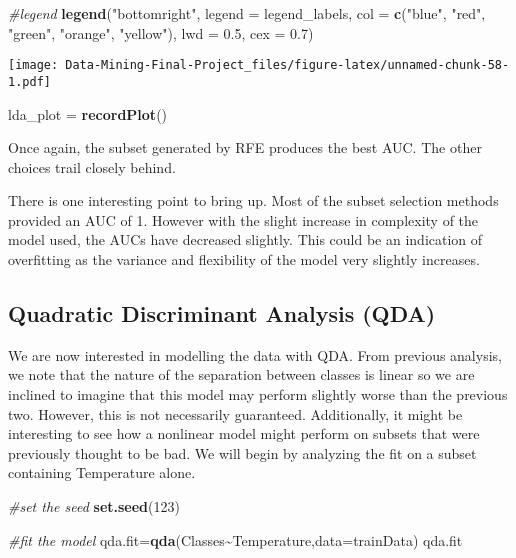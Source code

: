 \documentclass[
]{article}
\newenvironment{Shaded}{\begin{snugshade}}{\end{snugshade}}
\newcommand{\AttributeTok}[1]{\textcolor[rgb]{0.13,0.29,0.53}{#1}}
\newcommand{\CommentTok}[1]{\textcolor[rgb]{0.56,0.35,0.01}{\textit{#1}}}
\newcommand{\DecValTok}[1]{\textcolor[rgb]{0.00,0.00,0.81}{#1}}
\newcommand{\FloatTok}[1]{\textcolor[rgb]{0.00,0.00,0.81}{#1}}
\newcommand{\FunctionTok}[1]{\textcolor[rgb]{0.13,0.29,0.53}{\textbf{#1}}}
\newcommand{\NormalTok}[1]{#1}
\newcommand{\OtherTok}[1]{\textcolor[rgb]{0.56,0.35,0.01}{#1}}
\newcommand{\SpecialCharTok}[1]{\textcolor[rgb]{0.81,0.36,0.00}{\textbf{#1}}}
\newcommand{\StringTok}[1]{\textcolor[rgb]{0.31,0.60,0.02}{#1}}
\begin{document}
\begin{Shaded}
\begin{Highlighting}[]
\CommentTok{\#legend}
\FunctionTok{legend}\NormalTok{(}\StringTok{"bottomright"}\NormalTok{, }\AttributeTok{legend =}\NormalTok{ legend\_labels, }\AttributeTok{col =} \FunctionTok{c}\NormalTok{(}\StringTok{"blue"}\NormalTok{, }\StringTok{"red"}\NormalTok{, }\StringTok{"green"}\NormalTok{, }\StringTok{"orange"}\NormalTok{, }\StringTok{"yellow"}\NormalTok{), }\AttributeTok{lwd =} \FloatTok{0.5}\NormalTok{, }\AttributeTok{cex =} \FloatTok{0.7}\NormalTok{)}
\end{Highlighting}
\end{Shaded}

\texttt{[image: Data-Mining-Final-Project\_files/figure-latex/unnamed-chunk-58-1.pdf]}

\begin{Shaded}
\begin{Highlighting}[]
\NormalTok{lda\_plot }\OtherTok{=} \FunctionTok{recordPlot}\NormalTok{()}
\end{Highlighting}
\end{Shaded}

Once again, the subset generated by RFE produces the best AUC. The other
choices trail closely behind.

There is one interesting point to bring up. Most of the subset selection
methods provided an AUC of 1. However with the slight increase in
complexity of the model used, the AUCs have decreased slightly. This
could be an indication of overfitting as the variance and flexibility of
the model very slightly increases.

\subsection{Quadratic Discriminant Analysis
(QDA)}\label{quadratic-discriminant-analysis-qda}

We are now interested in modelling the data with QDA. From previous
analysis, we note that the nature of the separation between classes is
linear so we are inclined to imagine that this model may perform
slightly worse than the previous two. However, this is not necessarily
guaranteed. Additionally, it might be interesting to see how a nonlinear
model might perform on subsets that were previously thought to be bad.
We will begin by analyzing the fit on a subset containing Temperature
alone.

\begin{Shaded}
\begin{Highlighting}[]
\CommentTok{\#set the seed}
\FunctionTok{set.seed}\NormalTok{(}\DecValTok{123}\NormalTok{)}

\CommentTok{\#fit the model}
\NormalTok{qda.fit}\OtherTok{=}\FunctionTok{qda}\NormalTok{(Classes}\SpecialCharTok{\textasciitilde{}}\NormalTok{Temperature,}\AttributeTok{data=}\NormalTok{trainData)}
\NormalTok{qda.fit}
\end{Highlighting}
\end{Shaded}
\end{document}
